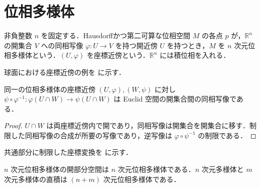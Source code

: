 \section{位相多様体}
\begin{defn}[位相多様体と座標近傍]
非負整数 $n$ を固定する．Hausdorffかつ第二可算な位相空間 $M$ の各点 $p$ が，$\mathbb R^n$ の開集合 $V$ への同相写像 $\varphi:U\to V$ を持つ開近傍 $U$ を持つとき，$M$ を $n$ 次元位相多様体という．$(U,\varphi)$ を座標近傍という．$\mathbb R^n$ には積位相を入れる．
\end{defn}
球面における座標近傍の例を  に示す．
\begin{prop}[座標変換]
同一の位相多様体の座標近傍 $(U,\varphi),(W,\psi)$ に対し $\psi\circ\varphi^{-1}:\varphi(U\cap W)\to\psi(U\cap W)$ は Euclid 空間の開集合間の同相写像である．
\end{prop}
\begin{proof}
$U\cap W$ は両座標近傍内で開であり，同相写像は開集合を開集合に移す．制限した同相写像の合成が所要の写像であり，逆写像は $\varphi\circ\psi^{-1}$ の制限である．
\end{proof}
共通部分に制限した座標変換を  に示す．
\begin{prop}[開部分多様体と直積]
$n$ 次元位相多様体の開部分空間は $n$ 次元位相多様体である．$n$ 次元多様体と $m$ 次元多様体の直積は $(n+m)$ 次元位相多様体である．
\end{prop}
